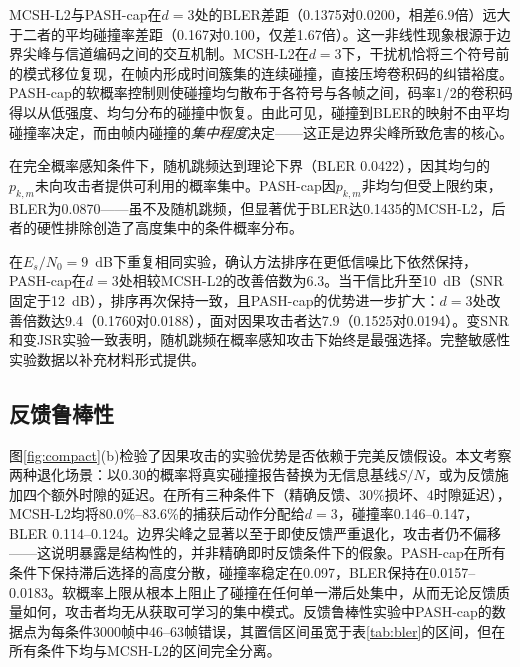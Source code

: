 \documentclass[lettersize,journal]{IEEEtran}
\begin{document}
MCSH-L2与PASH-cap在$d{=}3$处的BLER差距（0.1375对0.0200，相差6.9倍）远大于二者的平均碰撞率差距（0.167对0.100，仅差1.67倍）。这一非线性现象根源于边界尖峰与信道编码之间的交互机制。MCSH-L2在$d{=}3$下，干扰机恰将三个符号前的模式移位复现，在帧内形成时间簇集的连续碰撞，直接压垮卷积码的纠错裕度。PASH-cap的软概率控制则使碰撞均匀散布于各符号与各帧之间，码率$1/2$的卷积码得以从低强度、均匀分布的碰撞中恢复。由此可见，碰撞到BLER的映射不由平均碰撞率决定，而由帧内碰撞的\emph{集中程度}决定——这正是边界尖峰所致危害的核心。

在完全概率感知条件下，随机跳频达到理论下界（BLER 0.0422），因其均匀的$p_{k,m}$未向攻击者提供可利用的概率集中。PASH-cap因$p_{k,m}$非均匀但受上限约束，BLER为0.0870——虽不及随机跳频，但显著优于BLER达0.1435的MCSH-L2，后者的硬性排除创造了高度集中的条件概率分布。

在$E_s/N_0{=}9$~dB下重复相同实验，确认方法排序在更低信噪比下依然保持，PASH-cap在$d{=}3$处相较MCSH-L2的改善倍数为6.3。当干信比升至10~dB（SNR固定于12~dB），排序再次保持一致，且PASH-cap的优势进一步扩大：$d{=}3$处改善倍数达9.4（0.1760对0.0188），面对因果攻击者达7.9（0.1525对0.0194）。变SNR和变JSR实验一致表明，随机跳频在概率感知攻击下始终是最强选择。完整敏感性实验数据以补充材料形式提供。

\subsection{反馈鲁棒性}
图\ref{fig:compact}(b)检验了因果攻击的实验优势是否依赖于完美反馈假设。本文考察两种退化场景：以0.30的概率将真实碰撞报告替换为无信息基线$S/N$，或为反馈施加四个额外时隙的延迟。在所有三种条件下（精确反馈、30\%损坏、4时隙延迟），MCSH-L2均将80.0\%--83.6\%的捕获后动作分配给$d{=}3$，碰撞率0.146--0.147，BLER 0.114--0.124。边界尖峰之显著以至于即使反馈严重退化，攻击者仍不偏移——这说明暴露是结构性的，并非精确即时反馈条件下的假象。PASH-cap在所有条件下保持滞后选择的高度分散，碰撞率稳定在0.097，BLER保持在0.0157--0.0183。软概率上限从根本上阻止了碰撞在任何单一滞后处集中，从而无论反馈质量如何，攻击者均无从获取可学习的集中模式。反馈鲁棒性实验中PASH-cap的数据点为每条件3000帧中46--63帧错误，其置信区间虽宽于表\ref{tab:bler}的区间，但在所有条件下均与MCSH-L2的区间完全分离。
\end{document}
